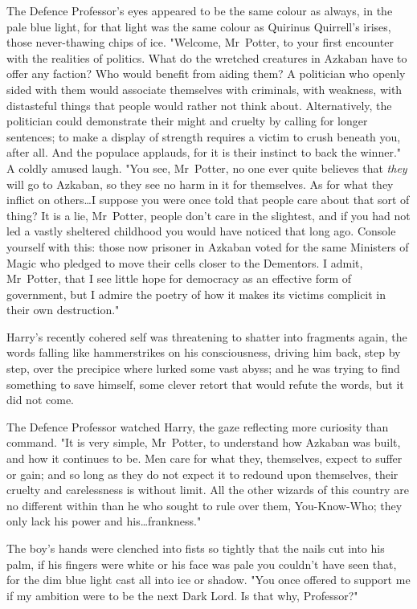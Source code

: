 The Defence Professor's eyes appeared to be the same colour as always, in the
pale blue light, for that light was the same colour as Quirinus Quirrell's
irises, those never-thawing chips of ice. "Welcome, Mr~Potter, to your first
encounter with the realities of politics. What do the wretched creatures in
Azkaban have to offer any faction? Who would benefit from aiding them? A
politician who openly sided with them would associate themselves with
criminals, with weakness, with distasteful things that people would rather not
think about. Alternatively, the politician could demonstrate their might and
cruelty by calling for longer sentences; to make a display of strength requires
a victim to crush beneath you, after all. And the populace applauds, for it is
their instinct to back the winner." A coldly amused laugh. "You see,
Mr~Potter, no one ever quite believes that \emph{they} will go to Azkaban, so
they see no harm in it for themselves. As for what they inflict on
others…I suppose you were once told that people care about that sort of
thing? It is a lie, Mr~Potter, people don't care in the slightest, and if you
had not led a vastly sheltered childhood you would have noticed that long ago.
Console yourself with this: those now prisoner in Azkaban voted for the same
Ministers of Magic who pledged to move their cells closer to the Dementors. I
admit, Mr~Potter, that I see little hope for democracy as an effective form of
government, but I admire the poetry of how it makes its victims complicit in
their own destruction."

Harry's recently cohered self was threatening to shatter into fragments again,
the words falling like hammerstrikes on his consciousness, driving him back,
step by step, over the precipice where lurked some vast abyss; and he was
trying to find something to save himself, some clever retort that would refute
the words, but it did not come.

The Defence Professor watched Harry, the gaze reflecting more curiosity than
command. "It is very simple, Mr~Potter, to understand how Azkaban was built,
and how it continues to be. Men care for what they, themselves, expect to
suffer or gain; and so long as they do not expect it to redound upon
themselves, their cruelty and carelessness is without limit. All the other
wizards of this country are no different within than he who sought to rule over
them, You-Know-Who; they only lack his power and his…frankness."

The boy's hands were clenched into fists so tightly that the nails cut into his
palm, if his fingers were white or his face was pale you couldn't have seen
that, for the dim blue light cast all into ice or shadow. "You once offered to
support me if my ambition were to be the next Dark Lord. Is that why,
Professor?"


